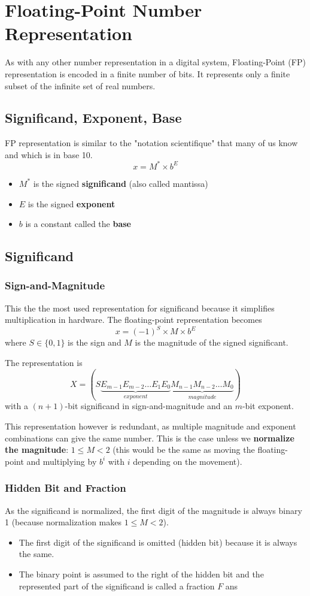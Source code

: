 \documentclass[10pt,a4paper]{book}
\begin{document}
\section{Floating-Point Number Representation}
As with any other number representation in a digital system, Floating-Point (FP) representation is encoded in a finite number of bits. It represents only a finite subset of the infinite set of real numbers.

\subsection{Significand, Exponent, Base}
FP representation is similar to the "notation scientifique" that many of us know and which is in base 10.
\[x=M^*\times b^E\]
\begin{itemize}
\item[ ] $M^*$ is the signed \textbf{significand} (also called mantissa)
\item[ ] $E$ is the signed \textbf{exponent}
\item[ ] $b$ is a constant called the \textbf{base}
\end{itemize}

\subsection{Significand}
\subsubsection{Sign-and-Magnitude}
This the the most used representation for significand because it simplifies multiplication in hardware. The floating-point representation becomes
\[x=(-1)^S\times M\times b^E\]
where $S\in\{0,1\}$ is the sign and $M$ is the magnitude of the signed significant.\par 
The representation is
\[X=(S\underbrace{E_{m-1}E_{m-2}\ldots E_1E_0}_{exponent}\underbrace{M_{n-1}M_{n-2}\ldots M_0}_{magnitude})\]
with a $(n+1)$-bit significand in sign-and-magnitude and an $m$-bit exponent.\par 
This representation however is redundant, as multiple magnitude and exponent combinations can give the same number. This is the case unless we \textbf{normalize the magnitude}: $1\leq M<2$ (this would be the same as moving the floating-point and multiplying by $b^i$ with $i$ depending on the movement).

\subsubsection{Hidden Bit and Fraction}
As the significand is normalized, the first digit of the magnitude is always binary 1 (because normalization makes $1\leq M<2$).
\begin{itemize}
\item[ ]The first digit of the significand is omitted (hidden bit) because it is always the same.
\item[ ]The binary point is assumed to the right of the hidden bit and the represented part of the significand is called a fraction $F$ ans 
\end{itemize}
\end{document}
